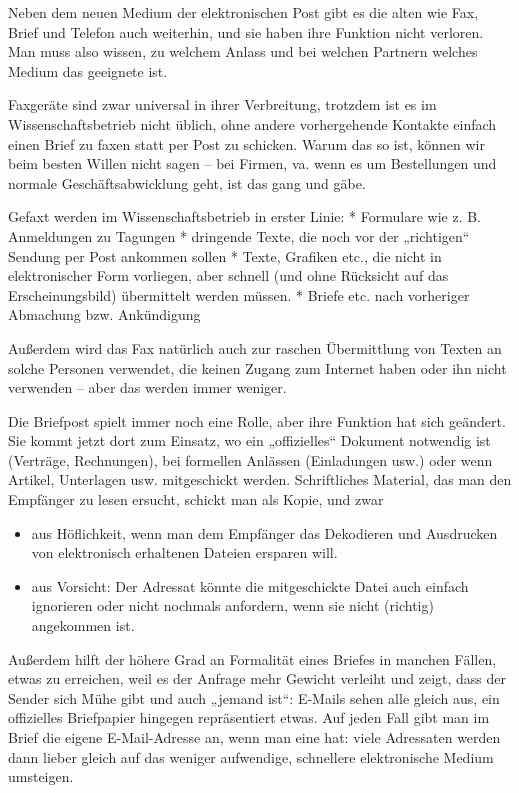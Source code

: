 \documentclass[]{book}
\providecommand{\tightlist}{%
  \setlength{\itemsep}{0pt}\setlength{\parskip}{0pt}}
\theoremstyle{definition}
\theoremstyle{definition}
\theoremstyle{definition}
\theoremstyle{remark}
\begin{document}
Neben dem neuen Medium der elektronischen Post gibt es die alten wie
Fax, Brief und Telefon auch weiterhin, und sie haben ihre Funktion nicht
verloren. Man muss also wissen, zu welchem Anlass und bei welchen
Partnern welches Medium das geeignete ist.

Faxgeräte sind zwar universal in ihrer Verbreitung, trotzdem ist es im
Wissenschaftsbetrieb nicht üblich, ohne andere vorhergehende Kontakte
einfach einen Brief zu faxen statt per Post zu schicken. Warum das so
ist, können wir beim besten Willen nicht sagen -- bei Firmen, va. wenn
es um Bestellungen und normale Geschäftsabwicklung geht, ist das gang
und gäbe.

Gefaxt werden im Wissenschaftsbetrieb in erster Linie: * Formulare wie
z. B. Anmeldungen zu Tagungen * dringende Texte, die noch vor der
„richtigen`` Sendung per Post ankommen sollen * Texte, Grafiken etc.,
die nicht in elektronischer Form vorliegen, aber schnell (und ohne
Rücksicht auf das Erscheinungsbild) übermittelt werden müssen. * Briefe
etc. nach vorheriger Abmachung bzw. Ankündigung

Außerdem wird das Fax natürlich auch zur raschen Übermittlung von Texten
an solche Personen verwendet, die keinen Zugang zum Internet haben oder
ihn nicht verwenden -- aber das werden immer weniger.

Die Briefpost spielt immer noch eine Rolle, aber ihre Funktion hat sich
geändert. Sie kommt jetzt dort zum Einsatz, wo ein „offizielles``
Dokument notwendig ist (Verträge, Rechnungen), bei formellen Anlässen
(Einladungen usw.) oder wenn Artikel, Unterlagen usw. mitgeschickt
werden. Schriftliches Material, das man den Empfänger zu lesen ersucht,
schickt man als Kopie, und zwar

\begin{itemize}
\tightlist
\item
  aus Höflichkeit, wenn man dem Empfänger das Dekodieren und Ausdrucken
  von elektronisch erhaltenen Dateien ersparen will.
\item
  aus Vorsicht: Der Adressat könnte die mitgeschickte Datei auch einfach
  ignorieren oder nicht nochmals anfordern, wenn sie nicht (richtig)
  angekommen ist.
\end{itemize}

Außerdem hilft der höhere Grad an Formalität eines Briefes in manchen
Fällen, etwas zu erreichen, weil es der Anfrage mehr Gewicht verleiht
und zeigt, dass der Sender sich Mühe gibt und auch „jemand ist``:
E-Mails sehen alle gleich aus, ein offizielles Briefpapier hingegen
repräsentiert etwas. Auf jeden Fall gibt man im Brief die eigene
E-Mail-Adresse an, wenn man eine hat: viele Adressaten werden dann
lieber gleich auf das weniger aufwendige, schnellere elektronische
Medium umsteigen.
\end{document}
